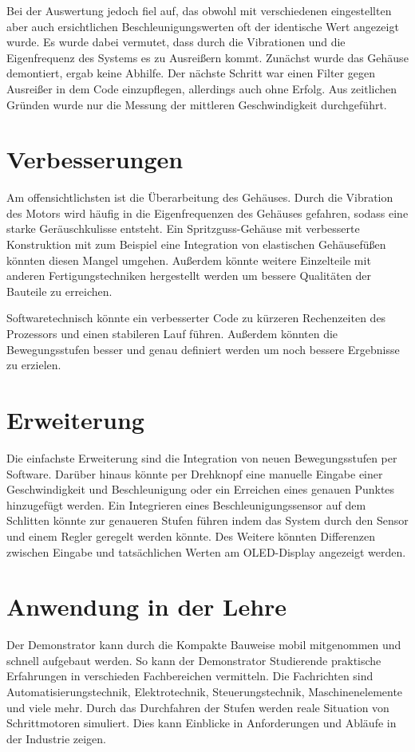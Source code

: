 Bei der Auswertung jedoch fiel auf, das obwohl mit verschiedenen eingestellten aber auch ersichtlichen Beschleunigungswerten oft der identische Wert angezeigt wurde. Es wurde dabei vermutet, dass durch die Vibrationen und die Eigenfrequenz des Systems es zu Ausreißern kommt. Zunächst wurde das Gehäuse demontiert, ergab keine Abhilfe. Der nächste Schritt war einen Filter gegen Ausreißer in dem Code einzupflegen, allerdings auch ohne Erfolg. Aus zeitlichen Gründen wurde nur die Messung der mittleren Geschwindigkeit durchgeführt.   

\section{Verbesserungen}

Am offensichtlichsten ist die Überarbeitung des Gehäuses. Durch die Vibration des Motors wird häufig in die Eigenfrequenzen des Gehäuses gefahren, sodass eine starke Geräuschkulisse entsteht. Ein Spritzguss-Gehäuse mit verbesserte Konstruktion mit zum Beispiel eine Integration von elastischen Gehäusefüßen könnten diesen Mangel umgehen. Außerdem könnte weitere Einzelteile mit anderen Fertigungstechniken hergestellt werden um bessere Qualitäten der Bauteile zu erreichen.

Softwaretechnisch könnte ein verbesserter Code zu kürzeren Rechenzeiten des Prozessors und einen stabileren Lauf führen. Außerdem könnten die Bewegungsstufen besser und genau definiert werden um noch bessere Ergebnisse zu erzielen.   


\section{Erweiterung}

Die einfachste Erweiterung sind die Integration von neuen Bewegungsstufen per Software. Darüber hinaus könnte per Drehknopf eine manuelle Eingabe einer Geschwindigkeit und Beschleunigung oder ein Erreichen eines genauen Punktes hinzugefügt werden. Ein Integrieren eines Beschleunigungssensor auf dem Schlitten könnte zur genaueren Stufen führen indem das System durch den Sensor und einem Regler geregelt werden könnte. Des Weitere könnten Differenzen zwischen Eingabe und tatsächlichen Werten am OLED-Display angezeigt werden. 

\section{Anwendung in der Lehre}

Der Demonstrator kann durch die Kompakte Bauweise mobil mitgenommen und schnell aufgebaut werden. So kann der Demonstrator Studierende praktische Erfahrungen in verschieden Fachbereichen vermitteln. Die Fachrichten sind Automatisierungstechnik, Elektrotechnik, Steuerungstechnik, Maschinenelemente und viele mehr. Durch das Durchfahren der Stufen werden reale Situation von Schrittmotoren simuliert. Dies kann Einblicke in Anforderungen und Abläufe in der Industrie zeigen. 
